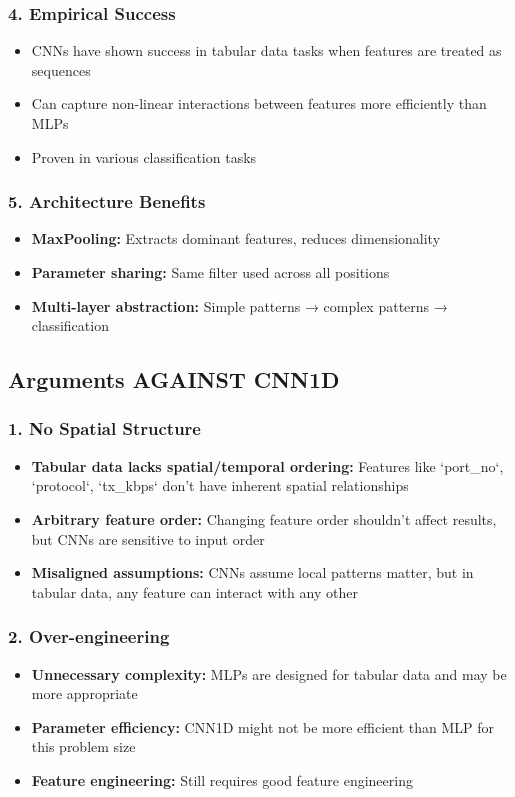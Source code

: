 \documentclass[12pt]{article}
\begin{document}
\subsubsection{4. Empirical Success}
\begin{itemize}
    \item CNNs have shown success in tabular data tasks when features are treated as sequences
    \item Can capture non-linear interactions between features more efficiently than MLPs
    \item Proven in various classification tasks
\end{itemize}

\subsubsection{5. Architecture Benefits}
\begin{itemize}
    \item \textbf{MaxPooling:} Extracts dominant features, reduces dimensionality
    \item \textbf{Parameter sharing:} Same filter used across all positions
    \item \textbf{Multi-layer abstraction:} Simple patterns → complex patterns → classification
\end{itemize}

\subsection{Arguments AGAINST CNN1D}

\subsubsection{1. No Spatial Structure}
\begin{itemize}
    \item \textbf{Tabular data lacks spatial/temporal ordering:} Features like `port_no`, `protocol`, `tx_kbps` don't have inherent spatial relationships
    \item \textbf{Arbitrary feature order:} Changing feature order shouldn't affect results, but CNNs are sensitive to input order
    \item \textbf{Misaligned assumptions:} CNNs assume local patterns matter, but in tabular data, any feature can interact with any other
\end{itemize}

\subsubsection{2. Over-engineering}
\begin{itemize}
    \item \textbf{Unnecessary complexity:} MLPs are designed for tabular data and may be more appropriate
    \item \textbf{Parameter efficiency:} CNN1D might not be more efficient than MLP for this problem size
    \item \textbf{Feature engineering:} Still requires good feature engineering
\end{itemize}
\end{document}
